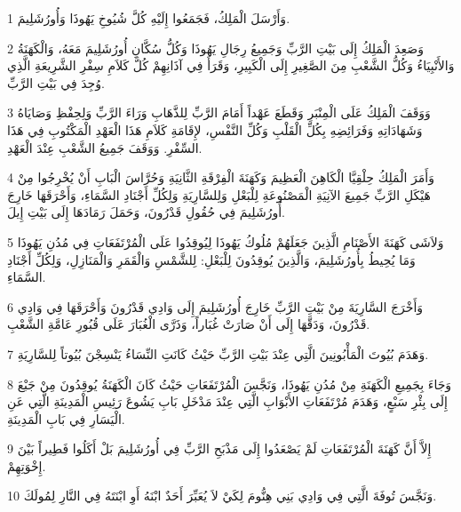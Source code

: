 \par 1 وَأَرْسَلَ الْمَلِكُ، فَجَمَعُوا إِلَيْهِ كُلَّ شُيُوخِ يَهُوذَا وَأُورُشَلِيمَ.
\par 2 وَصَعِدَ الْمَلِكُ إِلَى بَيْتِ الرَّبِّ وَجَمِيعُ رِجَالِ يَهُوذَا وَكُلُّ سُكَّانِ أُورُشَلِيمَ مَعَهُ، وَالْكَهَنَةُ وَالأَنْبِيَاءُ وَكُلُّ الشَّعْبِ مِنَ الصَّغِيرِ إِلَى الْكَبِيرِ، وَقَرَأَ فِي آذَانِهِمْ كُلَّ كَلاَمِ سِفْرِ الشَّرِيعَةِ الَّذِي وُجِدَ فِي بَيْتِ الرَّبِّ.
\par 3 وَوَقَفَ الْمَلِكُ عَلَى الْمِنْبَرِ وَقَطَعَ عَهْداً أَمَامَ الرَّبِّ لِلذَّهَابِ وَرَاءَ الرَّبِّ وَلِحِفْظِ وَصَايَاهُ وَشَهَادَاتِهِ وَفَرَائِضِهِ بِكُلِّ الْقَلْبِ وَكُلِّ النَّفْسِ، لإِقَامَةِ كَلاَمِ هَذَا الْعَهْدِ الْمَكْتُوبِ فِي هَذَا السِّفْرِ. وَوَقَفَ جَمِيعُ الشَّعْبِ عِنْدَ الْعَهْدِ.
\par 4 وَأَمَرَ الْمَلِكُ حِلْقِيَّا الْكَاهِنَ الْعَظِيمَ وَكَهَنَةَ الْفِرْقَةِ الثَّانِيَةِ وَحُرَّاسَ الْبَابِ أَنْ يُخْرِجُوا مِنْ هَيْكَلِ الرَّبِّ جَمِيعَ الآنِيَةِ الْمَصْنُوعَةِ لِلْبَعْلِ وَلِلسَّارِيَةِ وَلِكُلِّ أَجْنَادِ السَّمَاءِ، وَأَحْرَقَهَا خَارِجَ أُورُشَلِيمَ فِي حُقُولِ قَدْرُونَ، وَحَمَلَ رَمَادَهَا إِلَى بَيْتِ إِيلَ.
\par 5 وَلاَشَى كَهَنَةَ الأَصْنَامِ الَّذِينَ جَعَلَهُمْ مُلُوكُ يَهُوذَا لِيُوقِدُوا عَلَى الْمُرْتَفَعَاتِ فِي مُدُنِ يَهُوذَا وَمَا يُحِيطُ بِأُورُشَلِيمَ، وَالَّذِينَ يُوقِدُونَ لِلْبَعْلِ: لِلشَّمْسِ وَالْقَمَرِ وَالْمَنَازِلِ، وَلِكُلِّ أَجْنَادِ السَّمَاءِ.
\par 6 وَأَخْرَجَ السَّارِيَةَ مِنْ بَيْتِ الرَّبِّ خَارِجَ أُورُشَلِيمَ إِلَى وَادِي قَدْرُونَ وَأَحْرَقَهَا فِي وَادِي قَدْرُونَ، وَدَقَّهَا إِلَى أَنْ صَارَتْ غُبَاراً، وَذَرَّى الْغُبَارَ عَلَى قُبُورِ عَامَّةِ الشَّعْبِ.
\par 7 وَهَدَمَ بُيُوتَ الْمَأْبُونِينَ الَّتِي عِنْدَ بَيْتِ الرَّبِّ حَيْثُ كَانَتِ النِّسَاءُ يَنْسِجْنَ بُيُوتاً لِلسَّارِيَةِ.
\par 8 وَجَاءَ بِجَمِيعِ الْكَهَنَةِ مِنْ مُدُنِ يَهُوذَا، وَنَجَّسَ الْمُرْتَفَعَاتِ حَيْثُ كَانَ الْكَهَنَةُ يُوقِدُونَ مِنْ جَبْعَ إِلَى بِئْرِ سَبْعٍ، وَهَدَمَ مُرْتَفَعَاتِ الأَبْوَابِ الَّتِي عِنْدَ مَدْخَلِ بَابِ يَشُوعَ رَئِيسِ الْمَدِينَةِ الَّتِي عَنِ الْيَسَارِ فِي بَابِ الْمَدِينَةِ.
\par 9 إِلاَّ أَنَّ كَهَنَةَ الْمُرْتَفَعَاتِ لَمْ يَصْعَدُوا إِلَى مَذْبَحِ الرَّبِّ فِي أُورُشَلِيمَ بَلْ أَكَلُوا فَطِيراً بَيْنَ إِخْوَتِهِمْ.
\par 10 وَنَجَّسَ تُوفَةَ الَّتِي فِي وَادِي بَنِي هِنُّومَ لِكَيْ لاَ يُعَبِّرَ أَحَدٌ ابْنَهُ أَوِ ابْنَتَهُ فِي النَّارِ لِمُولَكَ.

